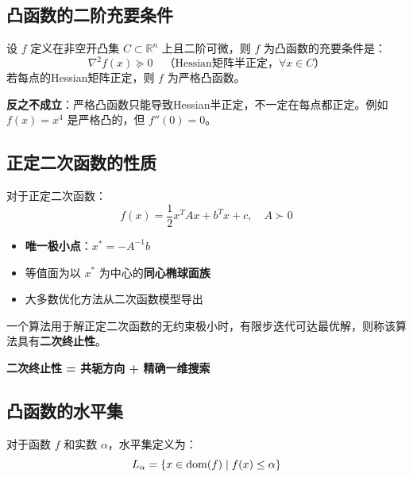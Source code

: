 \subsection{凸函数的二阶充要条件}

\begin{theorem}[凸函数的二阶充要条件]\label{thm:convex-second-order}
设 $f$ 定义在非空开凸集 $C \subset \mathbb{R}^n$ 上且二阶可微，则 $f$ 为凸函数的充要条件是：
\[
\nabla^2 f(x) \succeq 0 \quad \text{（Hessian矩阵半正定，$\forall x \in C$）}
\]
若每点的Hessian矩阵正定，则 $f$ 为严格凸函数。
\end{theorem}

\begin{notebox}[重要区别]
\textbf{反之不成立}：严格凸函数只能导致Hessian半正定，不一定在每点都正定。例如 $f(x) = x^4$ 是严格凸的，但 $f''(0) = 0$。
\end{notebox}

\subsection{正定二次函数的性质}

对于正定二次函数：
\[
f(x) = \frac{1}{2}x^T A x + b^T x + c,\quad A \succ 0
\]

\begin{property}[二次函数的极值]
\begin{itemize}[itemsep=0.3em]
    \item \textbf{唯一极小点}：$x^* = -A^{-1}b$
    \item 等值面为以 $x^*$ 为中心的\textbf{同心椭球面族}
    \item 大多数优化方法从二次函数模型导出
\end{itemize}
\end{property}

\begin{definition}[二次终止性]
一个算法用于解正定二次函数的无约束极小时，有限步迭代可达最优解，则称该算法具有\textbf{二次终止性}。
\end{definition}

\textbf{二次终止性 = 共轭方向 + 精确一维搜索}

\subsection{凸函数的水平集}

\begin{definition}[水平集]
对于函数 $f$ 和实数 $\alpha$，水平集定义为：
\[
L_\alpha = \{x \in \operatorname{dom}(f) \mid f(x) \leq \alpha\}
\]
\end{definition}

